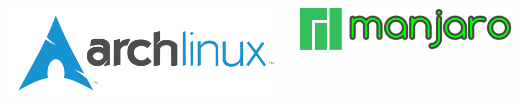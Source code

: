 \begin{frame}
	\vfill
	
	\begin{columns}
		\begin{column}{.5\linewidth}
			\centering\includegraphics[height=3\baselineskip]{../graphics/logos/Arch/archlinux-logo-dark-1200dpi.b42bd35d5916.png}
		\end{column}
		\hfill
		\begin{column}{.5\linewidth}
			\centering\includegraphics[height=2\baselineskip]{../graphics/logos/Manjaro/Main_page_logo.png}
		\end{column}
	\end{columns}
\end{frame}
